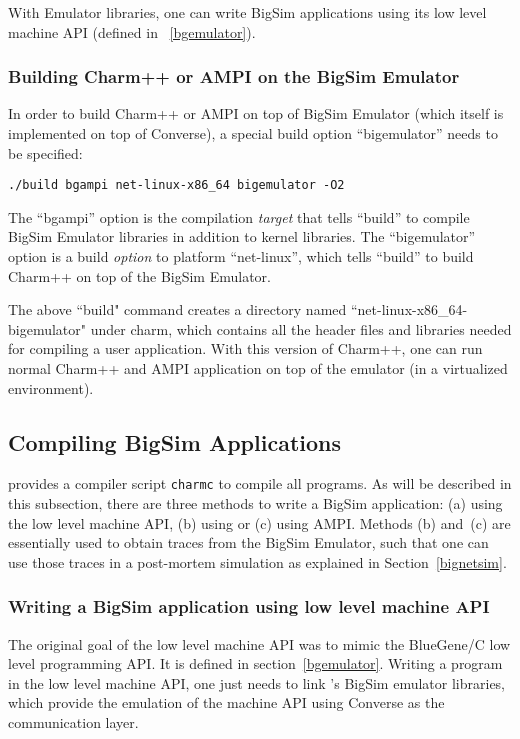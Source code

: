 With Emulator libraries, one can write BigSim applications using its
low level machine API (defined in ~\ref{bgemulator}).

\subsubsection{Building Charm++ or AMPI on the BigSim Emulator}

In order to build Charm++ or AMPI on top of BigSim Emulator (which itself is
implemented on top of Converse), a special build option ``bigemulator'' needs
to be specified:
\begin{verbatim}
./build bgampi net-linux-x86_64 bigemulator -O2
\end{verbatim}

The ``bgampi'' option is the compilation {\em target} that tells ``build'' to
compile BigSim Emulator libraries in addition to \charmpp{} kernel libraries.
The ``bigemulator'' option is a build {\em option} to platform ``net-linux'',
which tells ``build'' to build Charm++ on top of the BigSim Emulator. 

The above ``build" command creates a directory named
``net-linux-x86\_64-bigemulator" under charm, which contains all the header
files and libraries needed for compiling a user application.
With this version of Charm++, one can run normal Charm++ and AMPI application
on top of the emulator (in a virtualized environment).

\subsection{Compiling BigSim Applications}

\charmpp{} provides a compiler script {\tt charmc} to compile all programs.  As
will be described in this subsection, there are three methods to write a BigSim
application: (a) using the low level machine API, (b) using \charmpp{} or (c)
using AMPI. Methods (b) and~(c) are essentially used to obtain traces from the
BigSim Emulator, such that one can use those traces in a post-mortem simulation
as explained in Section~\ref{bignetsim}.

\subsubsection{Writing a BigSim application using low level machine API}
The original goal of the low level machine API was to mimic the BlueGene/C low
level programming API. It is defined in section~\ref{bgemulator}. Writing a
program in the low level machine API, one just needs to link \charmpp{}'s
BigSim emulator libraries, which provide the emulation of the machine API using
Converse as the communication layer.

